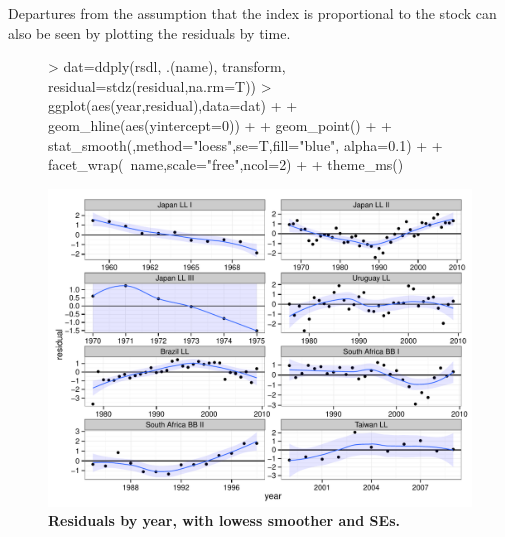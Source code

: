 \documentclass[shortnames,nojss,article]{jss}
\begin{document}
Departures from the assumption that the index is proportional to the stock can also be seen by plotting the residuals by time. 
\begin{figure}\begin{center}
\begin{Schunk}
\begin{Sinput}
> dat=ddply(rsdl, .(name), transform, residual=stdz(residual,na.rm=T))
> ggplot(aes(year,residual),data=dat) +
+   geom_hline(aes(yintercept=0))      +
+   geom_point()                       +
+   stat_smooth(,method="loess",se=T,fill="blue", alpha=0.1)  +
+   facet_wrap(~name,scale="free",ncol=2)   +
+              theme_ms() 
\end{Sinput}
\end{Schunk}
\includegraphics{diags-014}
\caption{\bf{Residuals by year, with lowess smoother and SEs.}}
\label{residual:2}
\end{center}
\end{figure}
\end{document}
